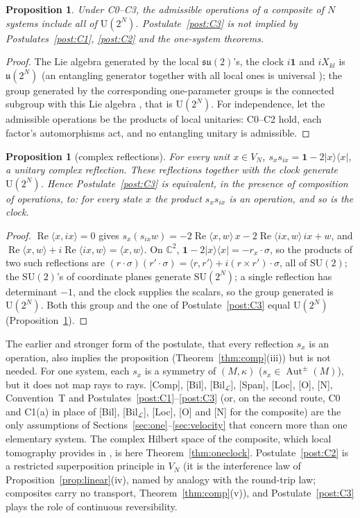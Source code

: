 \documentclass[aps,pra,onecolumn,superscriptaddress,nofootinbib,10pt]{revtex4-2}
\newtheorem{proposition}[theorem]{Proposition}
\theoremstyle{definition}
\theoremstyle{remark}
\newcommand{\C}{\mathbb{C}}
\newcommand{\su}{\mathfrak{su}}
\newcommand{\cL}{\mathcal{L}}
\newcommand{\Aut}{\operatorname{Aut}}
\newcommand{\re}{\operatorname{Re}}
\newcommand{\ip}[2]{\langle #1,#2\rangle}
\newcommand{\SU}{\mathrm{SU}}
\newcommand{\U}{\mathrm{U}}
\begin{document}
\begin{proposition}\label{prop:universal}
Under C0--C3, the admissible operations of a composite of $N$ systems
include all of $\U(2^N)$.  Postulate~\ref{post:C3} is not implied by Postulates~\ref{post:C1},
\ref{post:C2} and the one-system theorems.
\end{proposition}
\begin{proof}
The Lie algebra generated by the local $\su(2)$'s, the clock $i\mathbf1$ and $iX_{kl}$ is $\mathfrak u(2^N)$
(an entangling generator together with all local ones is universal \cite{BremnerEtAl}); the group
generated by the corresponding one-parameter groups is the connected subgroup with this Lie algebra
\cite{Yamabe}, that is $\U(2^N)$.  For independence, let the admissible operations be the products of
local unitaries: C0--C2 hold, each factor's automorphisms act, and no
entangling unitary is admissible.
\end{proof}
\begin{proposition}[complex reflections]\label{prop:complexrefl}
For every unit $x\in V_N$, $s_xs_{ix}=\mathbf1-2\lvert x\rangle\langle x\rvert$, a unitary complex reflection.  These
reflections together with the clock generate $\U(2^N)$.  Hence Postulate~\ref{post:C3} is equivalent,
in the presence of composition of operations, to: for every state $x$ the product $s_xs_{ix}$ is an
operation, and so is the clock.
\end{proposition}
\begin{proof}
$\re\ip{x}{ix}=0$ gives $s_x(s_{ix}w)=-2\re\ip xw\,x-2\re\ip{ix}w\,ix+w$, and
$\re\ip xw+i\re\ip{ix}w=\ip xw$.  On $\C^2$, $\mathbf1-2\lvert x\rangle\langle x\rvert=-r_x\cdot\sigma$, so the products
of two such reflections are $(r\cdot\sigma)(r'\cdot\sigma)=\ip r{r'}+i(r\times r')\cdot\sigma$, all of $\SU(2)$; the
$\SU(2)$'s of coordinate planes generate $\SU(2^N)$; a single reflection has determinant $-1$, and the
clock supplies the scalars, so the group generated is $\U(2^N)$.  Both this group and the one of
Postulate~\ref{post:C3} equal $\U(2^N)$ (Proposition~\ref{prop:universal}).
\end{proof}
The earlier and stronger form of the postulate, that every reflection $s_x$ is an operation, also
implies the proposition (Theorem~\ref{thm:comp}(iii)) but is not needed.  For one system, each $s_x$ is
a symmetry of $(M,\kappa)$ ($s_x\in\Aut^\pm(M)$), but it does not map rays to rays.
[Comp], [Bil], [Bil$_\cL$], [Span], [Loc], [O], [N], Convention~T and Postulates~\ref{post:C1}--\ref{post:C3} (or, on the
second route, C0 and C1(a) in place of [Bil], [Bil$_\cL$], [Loc], [O] and [N] for the composite) are the only assumptions of
Sections~\ref{sec:one}--\ref{sec:velocity} that concern more than one elementary system.  The complex
Hilbert space of the composite, which local tomography provides in \cite{Hardy,CDP,MM}, is here
Theorem~\ref{thm:oneclock}.  Postulate~\ref{post:C2} is a restricted superposition
principle in $V_N$ (it is the interference law of Proposition~\ref{prop:linear}(iv), named by analogy
with the round-trip law; composites carry no transport, Theorem~\ref{thm:comp}(v)), and
Postulate~\ref{post:C3} plays the role of continuous reversibility.
\end{document}
